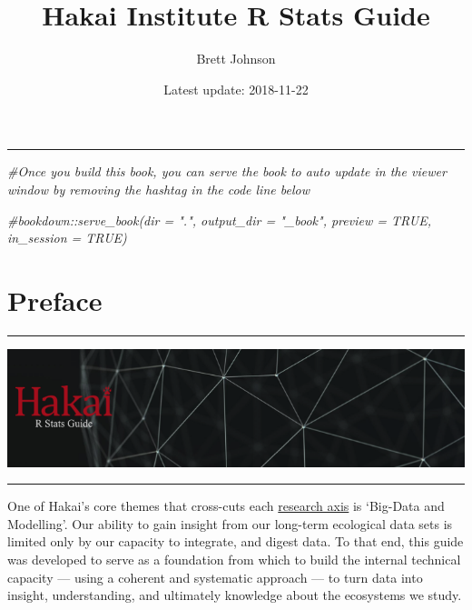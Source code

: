 \documentclass[]{book}
\title{Hakai Institute R Stats Guide}
\author{Brett Johnson}
\date{Latest update: 2018-11-22}
\newenvironment{Shaded}{\begin{snugshade}}{\end{snugshade}}
\newcommand{\CommentTok}[1]{\textcolor[rgb]{0.56,0.35,0.01}{\textit{#1}}}
\begin{document}
\maketitle

{
\setcounter{tocdepth}{0}
\tableofcontents
}
\begin{center}\rule{0.5\linewidth}{\linethickness}\end{center}

\begin{Shaded}
\begin{Highlighting}[]
\CommentTok{#Once you build this book, you can serve the book to auto update in the viewer window by removing the hashtag in the code line below}

\CommentTok{#bookdown::serve_book(dir = ".", output_dir = "_book", preview = TRUE, in_session = TRUE)}
\end{Highlighting}
\end{Shaded}

\chapter*{Preface}\label{preface}

\begin{center}\rule{0.5\linewidth}{\linethickness}\end{center}

\includegraphics[width=9.97in]{images/r_stats_red}

\begin{center}\rule{0.5\linewidth}{\linethickness}\end{center}

One of Hakai's core themes that cross-cuts each
\href{https://www.hakai.org/research}{research axis} is `Big-Data and
Modelling'. Our ability to gain insight from our long-term ecological
data sets is limited only by our capacity to integrate, and digest data.
To that end, this guide was developed to serve as a foundation from
which to build the internal technical capacity --- using a coherent and
systematic approach --- to turn data into insight, understanding, and
ultimately knowledge about the ecosystems we study.
\end{document}
